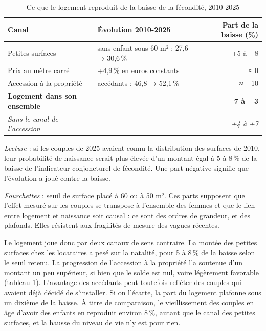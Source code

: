 \documentclass[11pt,a4paper]{article}
\begin{document}
\begin{table}[H]
	\centering
	\small
	\setlength{\tabcolsep}{6pt}
	\begin{threeparttable}
		\caption{Ce que le logement reproduit de la baisse de la fécondité, 2010-2025}
		\label{tab:decompo}
		\begin{tabular}{llr}
			\toprule
			Canal & Évolution 2010-2025 & Part de la baisse (\%) \\
			\midrule
			Petites surfaces & sans enfant sous 60 m² : 27,6 → 30,6\,\% & +5 à +8 \\
			Prix au mètre carré & +4,9\,\% en euros constants & ≈ 0 \\
			Accession à la propriété & accédants : 46,8 → 52,1\,\% & ≈ −10 \\
			\midrule
			\textbf{Logement dans son ensemble} & & \textbf{−7 à −3} \\
			\textit{Sans le canal de l'accession} & & \textit{+4 à +7} \\
			\bottomrule
		\end{tabular}
		\begin{tablenotes}[flushleft]\scriptsize
			\item \textit{Lecture} : si les couples de 2025 avaient connu la distribution des surfaces de 2010, leur probabilité de naissance serait plus élevée d'un montant égal à 5 à 8\,\% de la baisse de l'indicateur conjoncturel de fécondité. Une part négative signifie que l'évolution a joué contre la baisse.
			\item \textit{Fourchettes} : seuil de surface placé à 60 ou à 50 m². Ces parts supposent que l'effet mesuré sur les couples se transpose à l'ensemble des femmes et que le lien entre logement et naissance soit causal : ce sont des ordres de grandeur, et des plafonds. Elles résistent aux fragilités de mesure des vagues récentes.
		\end{tablenotes}
	\end{threeparttable}
\end{table}

Le logement joue donc par deux canaux de sens contraire. La montée des petites surfaces chez les locataires a pesé sur la natalité, pour 5 à 8\,\% de la baisse selon le seuil retenu. La progression de l'accession à la propriété l'a soutenue d'un montant un peu supérieur, si bien que le solde est nul, voire légèrement favorable (tableau \ref{tab:decompo}). L'avantage des accédants peut toutefois refléter des couples qui avaient déjà décidé de s'installer. Si on l'écarte, la part du logement plafonne sous un dixième de la baisse. À titre de comparaison, le vieillissement des couples en âge d'avoir des enfants en reproduit environ 8\,\%, autant que le canal des petites surfaces, et la hausse du niveau de vie n'y est pour rien.
\end{document}
